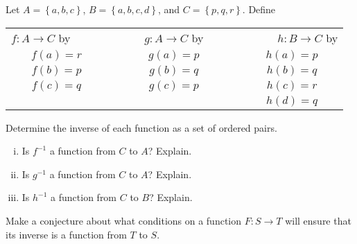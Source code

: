 \begin{activity} \label{prog:exploringinverse} 
Let  $A = \left\{ {a, b, c} \right\}$, $B = \left\{ {a,b,c,d} \right\}$, and 
$C = \left\{ {p, q, r} \right\}$.  Define
\begin{center}
\begin{tabular}{c  c  c}
$f: A \to C$ by ~~~~~&~~~~~  $g: A \to C$ by ~~~~~&~~~~~  $h: B \to C$ by \\
\hspace{-0.2in}$f( a ) = r $  &  \hspace{0.1in}$g( a ) = p $  &  \hspace{0.4in}$h( a ) = p $ \\
\hspace{-0.2in}$f( b ) = p $  &  \hspace{0.1in}$g( b ) = q $  &  \hspace{0.4in}$h( b ) = q $ \\
\hspace{-0.2in}$f( c ) = q $  &  \hspace{0.1in}$g( c ) = p $  &  \hspace{0.4in}$h( c ) = r $ \\
                          &                            &  \hspace{0.4in}$h( d ) = q $
\end{tabular}
\end{center}
	\ba

	\item Determine the inverse of each function as a set of ordered pairs.

	\item 
		\begin{enumerate}[i.] 
		\item Is  $f^{ - 1} $ a function from  $C$  to  $A$?  Explain.

		\item Is  $g^{ - 1} $ a function from  $C$  to  $A$?  Explain.

		\item Is  $h^{ - 1} $  a function from  $C$  to  $B$?  Explain.

		\end{enumerate}



	\item \label{A:exploringinverse3} Make a conjecture about what conditions on a function  $F: S \to T$ will ensure that its inverse is a function  from  $T$  to  $S$.

	\ea
\end{activity}


